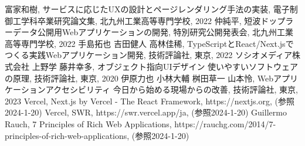 \begin{thebibliography}{99}
	富家和樹, サービスに応じたUXの設計とページレンダリング手法の実装, 電子制御工学科卒業研究論文集, 北九州工業高等専門学校, 2022
	仲純平, 短波ドップラーデータ公開用Webアプリケーションの開発, 特別研究公開発表会, 北九州工業高等専門学校, 2022
	手島拓也 吉田健人 高林佳稀, TypeScriptとReact/Next.jsでつくる実践Webアプリケーション開発, 技術評論社, 東京, 2022
	ソシオメディア株式会社 上野学 藤井幸多, オブジェクト指向UIデザイン 使いやすいソフトウェアの原理, 技術評論社, 東京, 2020
	伊原力也 小林大輔 桝田草一 山本怜, Webアプリケーションアクセシビリティ 今日から始める現場からの改善, 技術評論社, 東京, 2023
	Vercel, Next.js by Vercel - The React Framework, https://nextjs.org, (参照2024-1-20)
	Vercel, SWR, https://swr.vercel.app/ja, (参照2024-1-20)
	Guillermo Rauch, 7 Principles of Rich Web Applications, https://rauchg.com/2014/7-principles-of-rich-web-applications, (参照2024-1-20)
	
\end{thebibliography}